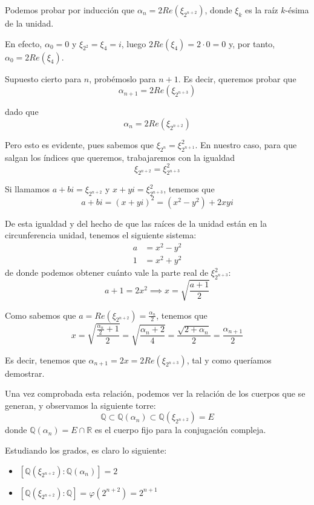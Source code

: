 \documentclass[a4paper, 11pt]{article}
\begin{document}
  \begin{solucion}
      Podemos probar por inducción que $\alpha_n = 2 Re(\xi_{2^{n+2}})$, donde $\xi_k$ es la raíz $k$-ésima de la unidad.

      En efecto, $\alpha_0 = 0$ y $\xi_{2^2} = \xi_4 = i$, luego $2 Re(\xi_4) = 2\cdot0 = 0$ y, por tanto, $\alpha_0 = 2 Re(\xi_4)$.

      Supuesto cierto para $n$, probémoslo para $n+1$. Es decir, queremos probar que
      \[
      \alpha_{n+1} = 2 Re(\xi_{2^{n+3}})
      \]

      dado que
      \[
      \alpha_n = 2 Re(\xi_{2^{n+2}})
      \]

      Pero esto es evidente, pues sabemos que $\xi_{2^n} = \xi_{2^{n+1}}^2$. En nuestro caso, para que salgan los índices que queremos, trabajaremos con la igualdad
      \[
      \xi_{2^{n+2}} = \xi_{2^{n+3}}^2
      \]

      Si llamamos $a+bi = \xi_{2^{n+2}}$ y $x+yi = \xi_{2^{n+3}}^2$, tenemos que
      \[
      a + bi = (x + yi)^2 = (x^2-y^2) + 2xyi
      \]

      De esta igualdad y del hecho de que las raíces de la unidad están en la circunferencia unidad, tenemos el siguiente sistema:
      \begin{align*}
          a &= x^2 - y^2 \\
          1 &= x^2 + y^2
      \end{align*}
      de donde podemos obtener cuánto vale la parte real de $\xi_{2^{n+3}}^2$:
      \[
      a + 1 = 2x^2 \implies x = \sqrt{\frac{a+1}{2}}
      \]

      Como sabemos que $a = Re(\xi_{2^{n+2}}) = \frac{\alpha_n}{2}$, tenemos que
      \[
      x = \sqrt{\frac{\frac{\alpha_n}{2}+1}{2}} = \sqrt{\frac{\alpha_n + 2}{4}} = \frac{\sqrt{2+\alpha_n}}{2} = \frac{\alpha_{n+1}}{2}
      \]

      Es decir, tenemos que $\alpha_{n+1} = 2x = 2Re(\xi_{2^{n+3}})$, tal y como queríamos demostrar.

      Una vez comprobada esta relación, podemos ver la relación de los cuerpos que se generan, y observamos la siguiente torre:
      \[
      \mathbb{Q} \subset \mathbb{Q}(\alpha_n) \subset \mathbb{Q}(\xi_{2^{n+2}}) = E
      \]
      donde $\mathbb{Q}(\alpha_n) = E \cap \mathbb{R}$ es el cuerpo fijo para la conjugación compleja.

      Estudiando los grados, es claro lo siguiente:
      \begin{itemize}
          \item $[\mathbb{Q}(\xi_{2^{n+2}}):\mathbb{Q}(\alpha_n)] = 2$
          \item $[\mathbb{Q}(\xi_{2^{n+2}}):\mathbb{Q}] = \varphi(2^{n+2}) = 2^{n+1}$
      \end{itemize}


\end{solucion}
\end{document}
